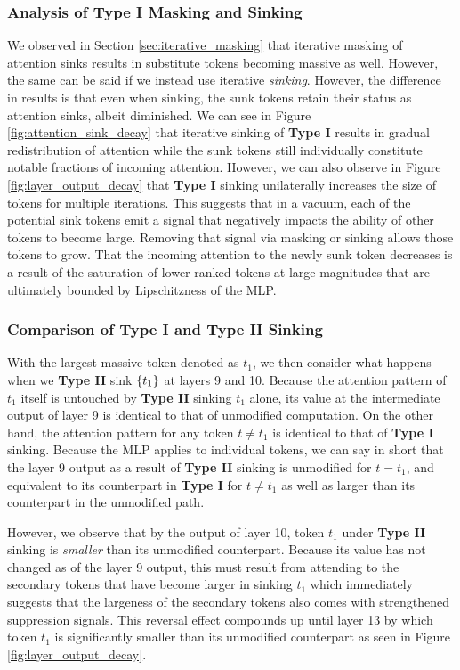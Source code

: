 \documentclass[10pt,twocolumn,letterpaper]{article}
\begin{document}
\subsubsection{Analysis of Type I Masking and Sinking}
We observed in Section \ref{sec:iterative_masking} that iterative masking of attention sinks results in substitute tokens becoming massive as well. However, the same can be said if we instead use iterative \textit{sinking}. However, the difference in results is that even when sinking, the sunk tokens retain their status as attention sinks, albeit diminished. We can see in Figure \ref{fig:attention_sink_decay} that iterative sinking of \textbf{Type I} results in gradual redistribution of attention while the sunk tokens still individually constitute notable fractions of incoming attention. However, we can also observe in Figure \ref{fig:layer_output_decay} that \textbf{Type I} sinking unilaterally increases the size of tokens for multiple iterations. This suggests that in a vacuum, each of the potential sink tokens emit a signal that negatively impacts the ability of other tokens to become large. Removing that signal via masking or sinking allows those tokens to grow. That the incoming attention to the newly sunk token decreases is a result of the saturation of lower-ranked tokens at large magnitudes that are ultimately bounded by Lipschitzness of the MLP.


\subsubsection{Comparison of Type I and Type II Sinking}
With the largest massive token denoted as $t_1$, we then consider what happens when we \textbf{Type II} sink $\{t_1\}$ at layers 9 and 10. Because the attention pattern of $t_1$ itself is untouched by \textbf{Type II} sinking $t_1$ alone, its value at the intermediate output of layer 9 is identical to that of unmodified computation. On the other hand, the attention pattern for any token $t \neq t_1$ is identical to that of \textbf{Type I} sinking. Because the MLP applies to individual tokens, we can say in short that the layer 9 output as a result of \textbf{Type II} sinking is unmodified for $t = t_1$, and equivalent to its counterpart in \textbf{Type I} for $t \neq t_1$ as well as larger than its counterpart in the unmodified path.

However, we observe that by the output of layer 10, token $t_1$ under \textbf{Type II} sinking is \textit{smaller} than its unmodified counterpart. Because its value has not changed as of the layer 9 output, this must result from attending to the secondary tokens that have become larger in sinking $t_1$ which immediately suggests that the largeness of the secondary tokens also comes with strengthened suppression signals. This reversal effect compounds up until layer 13 by which token $t_1$ is significantly smaller than its unmodified counterpart as seen in Figure \ref{fig:layer_output_decay}.
\end{document}
